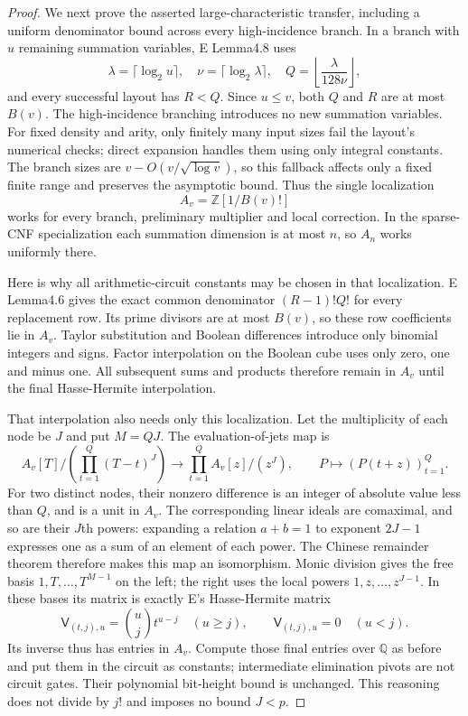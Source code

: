 \begin{proof}
We next prove the asserted large-characteristic transfer, including a uniform denominator bound across every high-incidence branch. In a branch with $u$ remaining summation variables, E Lemma4.8 uses
\[
 \lambda=\lceil\log_2u\rceil,\quad
 \nu=\lceil\log_2\lambda\rceil,\quad
 Q=\left\lfloor\frac{\lambda}{128\nu}\right\rfloor,
\]
and every successful layout has $R<Q$. Since $u\leq v$, both $Q$ and $R$ are at most $B(v)$. The high-incidence branching introduces no new summation variables. For fixed density and arity, only finitely many input sizes fail the layout's numerical checks; direct expansion handles them using only integral constants. The branch sizes are $v-O(v/\sqrt{\log v})$, so this fallback affects only a fixed finite range and preserves the asymptotic bound. Thus the single localization
\[
                       A_v=\mathbb Z[1/B(v)!]
\]
works for every branch, preliminary multiplier and local correction. In the sparse-CNF specialization each summation dimension is at most $n$, so $A_n$ works uniformly there.

Here is why all arithmetic-circuit constants may be chosen in that localization. E Lemma4.6 gives the exact common denominator $(R-1)!Q!$ for every replacement row. Its prime divisors are at most $B(v)$, so these row coefficients lie in $A_v$. Taylor substitution and Boolean differences introduce only binomial integers and signs. Factor interpolation on the Boolean cube uses only zero, one and minus one. All subsequent sums and products therefore remain in $A_v$ until the final Hasse-Hermite interpolation.

That interpolation also needs only this localization. Let the multiplicity of each node be $J$ and put $M=QJ$. The evaluation-of-jets map is
\[
 A_v[T]\big/\!\left(\prod_{t=1}^{Q}(T-t)^J\right)
       \longrightarrow\prod_{t=1}^{Q} A_v[z]/(z^J),
 \qquad P\longmapsto(P(t+z))_{t=1}^{Q}.
\]
For two distinct nodes, their nonzero difference is an integer of absolute value less than $Q$, and is a unit in $A_v$. The corresponding linear ideals are comaximal, and so are their $J$th powers: expanding a relation $a+b=1$ to exponent $2J-1$ expresses one as a sum of an element of each power. The Chinese remainder theorem therefore makes this map an isomorphism. Monic division gives the free basis $1,T,\ldots,T^{M-1}$ on the left; the right uses the local powers $1,z,\ldots,z^{J-1}$. In these bases its matrix is exactly E's Hasse-Hermite matrix
\[
  \mathsf V_{(t,j),u}=\binom uj t^{u-j}\quad(u\geq j),
               \qquad \mathsf V_{(t,j),u}=0\quad(u<j).
\]
Its inverse thus has entries in $A_v$. Compute those final entries over $\mathbb Q$ as before and put them in the circuit as constants; intermediate elimination pivots are not circuit gates. Their polynomial bit-height bound is unchanged. This reasoning does not divide by $j!$ and imposes no bound $J<p$.


\end{proof}
